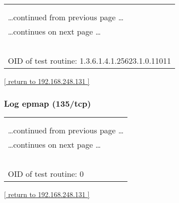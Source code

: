 \documentclass{article}
\begin{document}
\begin{longtable}{|p{}|}
\hline
\rowcolor{openvas_log}{\color{white}{Log (CVSS: 0.0) }}\\
\rowcolor{openvas_log}{\color{white}{NVT: SMB on port 445}}\\
\hline
\endfirsthead
\hfill\ldots continued from previous page \ldots \\
\hline
\endhead
\hline
\ldots continues on next page \ldots \\
\endfoot
\hline
\endlastfoot
\\
\rowcolor{white}{\verb=A CIFS server is running on this port=}\\
\rowcolor{white}{\verb==}\\
\rowcolor{white}{\verb==}\\
\\
OID of test routine: 1.3.6.1.4.1.25623.1.0.11011\\
\end{longtable}

\begin{footnotesize}\hyperref[host:192.168.248.131]{[ return to 192.168.248.131 ]}\end{footnotesize}
\subsubsection{Log epmap (135/tcp)}
\label{port:192.168.248.131 epmap (135/tcp) Log}

\begin{longtable}{|p{}|}
\hline
\rowcolor{openvas_log}{\color{white}{Log}}\\
\rowcolor{openvas_log}{\color{white}{NVT: }}\\
\hline
\endfirsthead
\hfill\ldots continued from previous page \ldots \\
\hline
\endhead
\hline
\ldots continues on next page \ldots \\
\endfoot
\hline
\endlastfoot
\\
\rowcolor{white}{\verb=Open port.=}\\
\rowcolor{white}{\verb==}\\
\rowcolor{white}{\verb==}\\
\\
OID of test routine: 0\\
\end{longtable}

\begin{footnotesize}\hyperref[host:192.168.248.131]{[ return to 192.168.248.131 ]}\end{footnotesize}
\end{document}
